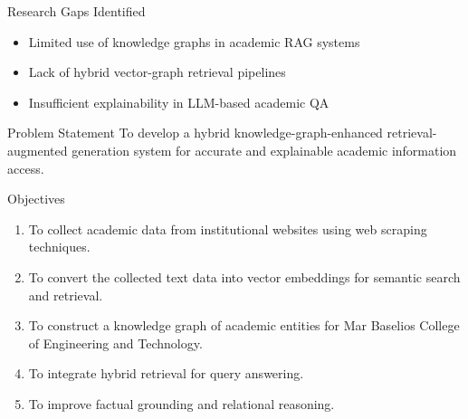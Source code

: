 \documentclass[10pt,aspectratio=1610]{beamer}
\begin{document}
\begin{frame}{Research Gaps Identified}
\begin{itemize}
\item Limited use of knowledge graphs in academic RAG systems
\item Lack of hybrid vector-graph retrieval pipelines
\item Insufficient explainability in LLM-based academic QA
\end{itemize}
\end{frame}

\begin{frame}{Problem Statement}
To develop a hybrid knowledge-graph-enhanced retrieval-augmented generation system for accurate and explainable academic information access.
\end{frame}


\begin{frame}{Objectives}
\begin{enumerate}
\item To collect academic data from institutional websites using web scraping techniques.  
\item To convert the collected text data into vector embeddings for semantic search and retrieval.
\item To construct a knowledge graph of academic entities for Mar Baselios College of Engineering and Technology.
\item To integrate hybrid retrieval for query answering.
\item To improve factual grounding and relational reasoning.
\end{enumerate}
\end{frame}

\end{document}
